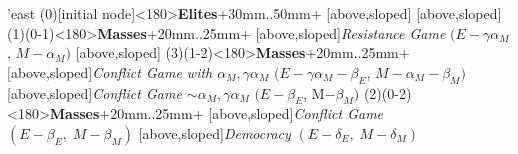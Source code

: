 	\begin{istgame}[font=\footnotesize]
	\centering
	\setistgrowdirection'{east}
	\xtShowArrows
	\istroot(0)[initial node]<180>{\textbf{Elites}}+30mm..50mm+
	[above,sloped]  [above,sloped] \endist
	\istroot(1)(0-1)<180>{\textbf{Masses}}+20mm..25mm+
	[above,sloped]{\textit{Resistance Game} $(E- \gamma\alpha_{M}$, $M-\alpha_{M})$ }
	[above,sloped]{ }  \endist
	\istroot(3)(1-2)<180>{\textbf{Masses}}+20mm..25mm+
	[above,sloped]{\textit{Conflict Game with $\alpha_{M}, \gamma\alpha_{M}$ }
		$(E- \gamma\alpha_{M}- \beta_{E}$, $M-\alpha_{M}-\beta_{M})$}
	[above,sloped]{\textit{Conflict Game $\sim\alpha_{M},\gamma\alpha_{M}$} 
		$(E- \beta_{E}$, M$-\beta_{M})$} \endist
	\istroot(2)(0-2)<180>{\textbf{Masses}}+20mm..25mm+
	[above,sloped]{\textit{Conflict Game} $(E - \beta_{E},\; M-\beta_{M})$}
	[above,sloped]{\textit{Democracy} $(E -\delta_{E},\; M- \delta_{M})$} \endist
\end{istgame}